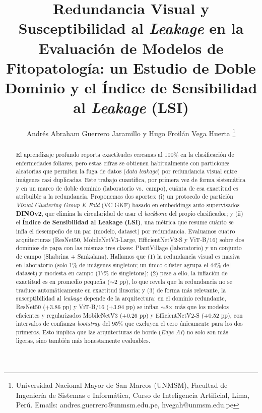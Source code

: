 \documentclass[journal,compsoc]{IEEEtran}
\begin{document}
\title{Redundancia Visual y Susceptibilidad al \textit{Leakage} en la Evaluación de Modelos de Fitopatología: un Estudio de Doble Dominio y el Índice de Sensibilidad al \textit{Leakage} (LSI)}

\author{Andrés Abraham Guerrero Jaramillo y Hugo Froilán Vega Huerta
\thanks{Universidad Nacional Mayor de San Marcos (UNMSM), Facultad de Ingeniería de Sistemas e Informática, Curso de Inteligencia Artificial, Lima, Perú. Emails: andres.guerrero@unmsm.edu.pe, hvegah@unmsm.edu.pe}}

\maketitle

\begin{abstract}
El aprendizaje profundo reporta exactitudes cercanas al 100\% en la clasificación de enfermedades foliares, pero estas cifras se obtienen habitualmente con particiones aleatorias que permiten la fuga de datos (\textit{data leakage}) por redundancia visual entre imágenes casi duplicadas. Este trabajo cuantifica, por primera vez de forma sistemática y en un marco de doble dominio (laboratorio vs.\ campo), cuánta de esa exactitud es atribuible a la redundancia. Proponemos dos aportes: (i) un protocolo de partición \textit{Visual-Clustering Group K-Fold} (VC-GKF) basado en embeddings auto-supervisados \textbf{DINOv2}, que elimina la circularidad de usar el \textit{backbone} del propio clasificador; y (ii) el \textbf{Índice de Sensibilidad al Leakage (LSI)}, una métrica que resume cuánto se infla el desempeño de un par (modelo, dataset) por redundancia. Evaluamos cuatro arquitecturas (ResNet50, MobileNetV3-Large, EfficientNetV2-S y ViT-B/16) sobre dos dominios de papa con las mismas tres clases: PlantVillage (laboratorio) y un conjunto de campo (Shabrina + Sankalana). Hallamos que (1) la redundancia visual es masiva en laboratorio (solo 1\% de imágenes singleton; un único clúster agrupa el 44\% del dataset) y modesta en campo (17\% de singletons); (2) pese a ello, la inflación de exactitud es en promedio pequeña ($\sim$2 pp), lo que revela que la redundancia no se traduce automáticamente en exactitud ilusoria; y (3) de forma más relevante, la susceptibilidad al \textit{leakage} depende de la arquitectura: en el dominio redundante, ResNet50 (+3.86 pp) y ViT-B/16 (+3.94 pp) se inflan $\sim$8$\times$ más que los modelos eficientes y regularizados MobileNetV3 (+0.26 pp) y EfficientNetV2-S (+0.52 pp), con intervalos de confianza \textit{bootstrap} del 95\% que excluyen el cero únicamente para los dos primeros. Esto implica que las arquitecturas de borde (\textit{Edge AI}) no solo son más ligeras, sino también más honestamente evaluables.
\end{abstract}
\end{document}
